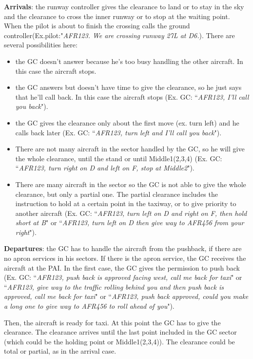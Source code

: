 \documentclass{article}
\begin{document}
\textbf{Arrivals}: the runway controller gives the clearance to land or to stay in the sky and the clearance to cross the inner runway or to stop at the waiting point. When the pilot is about to finish the crossing calls the ground controller(Ex.pilot:"\textit{AFR123. We are crossing runway 27L at D6.}). There are several possibilities here:
\begin{itemize}
	\item the GC doesn't answer because he's too busy handling the other aircraft. In this case the aircraft stops.
	\item the GC answers but doesn't have time to give the clearance, so he just says that he'll call back. In this case the aircraft stops (Ex. GC: ``\textit{AFR123, I'll call you back}").
	\item the GC gives the clearance only about the first move (ex. turn left) and he calls back later (Ex. GC: ``\textit{AFR123, turn left and I'll call you back}").
	\item There are not many aircraft in the sector handled by the GC, so he will give the whole clearance, until the stand or until Middle1(2,3,4) (Ex. GC: ``\textit{AFR123, turn right on D and left on F, stop at Middle2}").
	\item There are many aircraft in the sector so the GC is not able to give the whole clearance, but only a partial one. The partial clearance includes the instruction to hold at a certain point in the taxiway, or to give priority to another aircraft (Ex. GC: ``\textit{AFR123, turn left on D and right on F, then hold short at B}" or ``\textit{AFR123, turn left on D then give way to AFR456 from your right}").
\end{itemize}

\textbf{Departures}: the GC has to handle the aircraft from the pushback, if there are no apron services in his sectors. If there is the apron service, the GC receives the aircraft at the PAI. 
In the first case, the GC gives the permission to push back (Ex. GC: ``\textit{AFR123, push back is approved facing west, call me back for taxi}" or ``\textit{AFR123, give way to the traffic rolling behind you and then push back is approved, call me back for taxi}" or ``\textit{AFR123, push back approved, could you make a long one to give way to AFR456 to roll ahead of you}"). 

Then, the aircraft is ready for taxi. At this point the GC has to give the clearance. The clearance arrives until the last point included in the GC sector (which could be the holding point or Middle1(2,3,4)). The clearance could be total or partial, as in the arrival case.
\end{document}
